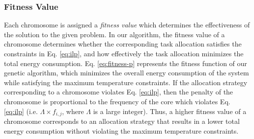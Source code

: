 \documentclass[conference]{IEEEtran}
\begin{document}
\subsubsection{Fitness Value} Each chromosome is assigned a \emph{fitness value} which determines the effectiveness of the solution
to the given problem. In our algorithm, the fitness value of a chromosome determines whether the corresponding task allocation
satisfies the constraints  in Eq. \ref{eq:ilp}, and how effectively
the task allocation minimizes the
total energy consumption.
%
%
%
%
Eq. \ref{eq:fitness-p} represents the fitness function of our genetic algorithm, which minimizes the
overall energy consumption of the system while satisfying the maximum temperature constraints.
If the allocation strategy corresponding to a chromosome violates Eq. \ref{eq:ilp}, then the penalty of the chromosome is
proportional to the frequency of the core
which violates  Eq. \ref{eq:ilp} (i.e. $\Lambda \times f_{i,j}$, where
$\Lambda$ is a large integer).
Thus, a higher fitness value of a chromosome corresponds to an allocation strategy that results in
a lower total energy consumption without violating the maximum temperature constraints.



\vspace{-0.2in}
\end{document}
